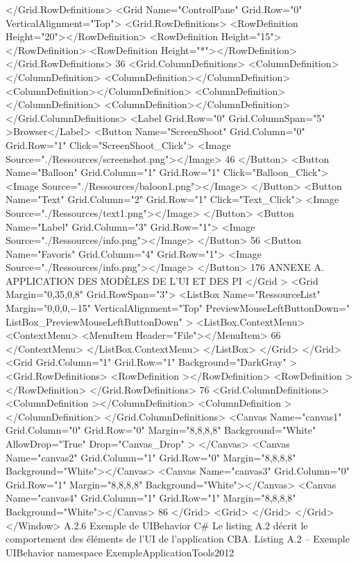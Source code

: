 \documentclass{article}
\begin{document}
</Grid.RowDeﬁnitions>
<Grid Name="ControlPane" Grid.Row="0" VerticalAlignment="Top">
<Grid.RowDeﬁnitions>
<RowDeﬁnition Height="20"></RowDeﬁnition>
<RowDeﬁnition Height="15"></RowDeﬁnition>
<RowDeﬁnition Height="*"></RowDeﬁnition>
</Grid.RowDeﬁnitions>
36
<Grid.ColumnDeﬁnitions>
<ColumnDeﬁnition></ColumnDeﬁnition>
<ColumnDeﬁnition></ColumnDeﬁnition>
<ColumnDeﬁnition></ColumnDeﬁnition>
<ColumnDeﬁnition></ColumnDeﬁnition>
<ColumnDeﬁnition></ColumnDeﬁnition>
</Grid.ColumnDeﬁnitions>
<Label Grid.Row="0" Grid.ColumnSpan="5" >Browser</Label>
<Button Name="ScreenShoot" Grid.Column="0" Grid.Row="1" Click="ScreenShoot_Click">
<Image Source="./Ressources/screenshot.png"></Image>
46
</Button>
<Button Name="Balloon" Grid.Column="1" Grid.Row="1" Click="Balloon_Click">
<Image Source="./Ressources/baloon1.png"></Image>
</Button>
<Button Name="Text" Grid.Column="2" Grid.Row="1" Click="Text_Click">
<Image Source="./Ressources/text1.png"></Image>
</Button>
<Button Name="Label" Grid.Column="3" Grid.Row="1">
<Image Source="./Ressources/info.png"></Image>
</Button>
56
<Button Name="Favoris" Grid.Column="4" Grid.Row="1">
<Image Source="./Ressources/info.png"></Image>
</Button>
176
ANNEXE A. APPLICATION DES MODÈLES DE L’UI ET DES PI
</Grid >
<Grid Margin="0,35,0,8" Grid.RowSpan="3">
<ListBox Name="RessourceList" Margin="0,0,0,−15" VerticalAlignment="Top" PreviewMouseLeftButtonDown="
ListBox_PreviewMouseLeftButtonDown" >
<ListBox.ContextMenu>
<ContextMenu>
<MenuItem Header="File"></MenuItem>
66
</ContextMenu>
</ListBox.ContextMenu>
</ListBox>
</Grid>
</Grid>
<Grid Grid.Column="1" Grid.Row="1" Background="DarkGray" >
<Grid.RowDeﬁnitions>
<RowDeﬁnition ></RowDeﬁnition>
<RowDeﬁnition ></RowDeﬁnition>
</Grid.RowDeﬁnitions>
76
<Grid.ColumnDeﬁnitions>
<ColumnDeﬁnition ></ColumnDeﬁnition>
<ColumnDeﬁnition ></ColumnDeﬁnition>
</Grid.ColumnDeﬁnitions>
<Canvas Name="canvas1" Grid.Column="0" Grid.Row="0" Margin="8,8,8,8" Background="White" AllowDrop="True"
Drop="Canvas_Drop" >
</Canvas>
<Canvas Name="canvas2" Grid.Column="1" Grid.Row="0" Margin="8,8,8,8" Background="White"></Canvas>
<Canvas Name="canvas3" Grid.Column="0" Grid.Row="1" Margin="8,8,8,8" Background="White"></Canvas>
<Canvas Name="canvas4" Grid.Column="1" Grid.Row="1" Margin="8,8,8,8" Background="White"></Canvas>
86
</Grid>
<Grid>
</Grid>
</Grid>
</Window>
A.2.6
Exemple de UIBehavior C#
Le listing A.2 décrit le comportement des éléments de l’UI de l’application CBA.
Listing A.2 – Exemple UIBehavior
namespace ExempleApplicationTools2012
\end{document}
